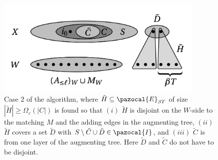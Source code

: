\begin{figure}
    \begin{center}
        \includegraphics[width=10cm]{chapters/santaclaus/SC_fig3.png}
        \caption{Case 2 of the algorithm, 
        where $\tilde{H} \subseteq \pazocal{E}_{\beta T}$ of size $|\tilde{H}| \geq \Omega_{\varepsilon}(|C|)$ 
        is found so that $(i)$ $\tilde{H}$ is disjoint on the $W$-side to the matching $M$ and the adding edges in the augmenting tree, 
        $(ii)$ $\tilde{H}$ covers a set $\tilde{D}$ with $S \setminus \tilde{C} \cup \tilde{D} \in \pazocal{I}$, 
        and $(iii)$ $\tilde{C}$ is from one layer of the augmenting tree. 
        Here $\tilde{D}$ and $\tilde{C}$ do not have to be disjoint.\label{fig:CaseIIofTheAlgorithm}}
    \end{center}
    \end{figure}
